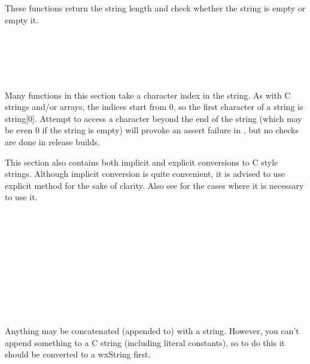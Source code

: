 \label{lengthfunctionsinwxstring}

These functions return the string length and check whether the string is empty
or empty it.

\\
\\
\\
\\

\label{characteraccessinwxstring}

Many functions in this section take a character index in the string. As with C
strings and/or arrays, the indices start from $0$, so the first character of a
string is string[$0$]. Attempt to access a character beyond the end of the
string (which may be even $0$ if the string is empty) will provoke an assert
failure in , but no checks are done in
release builds.

This section also contains both implicit and explicit conversions to C style
strings. Although implicit conversion is quite convenient, it is advised to use
explicit  method for the sake of clarity. Also
see  for the cases where it is necessary to
use it.

\\
\\
\\
\\
\\
\\
\\
\\
\\

\label{concatenationinwxstring}

Anything may be concatenated (appended to) with a string. However, you can't
append something to a C string (including literal constants), so to do this it
should be converted to a wxString first.

